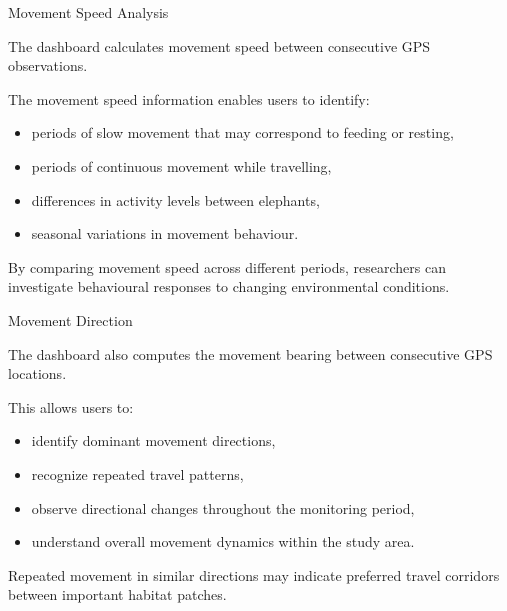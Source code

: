 \documentclass{beamer}
\begin{document}
	
	
	
	
	
		\begin{frame}{Movement Speed Analysis}
		
		The dashboard calculates movement speed between consecutive GPS observations.
		
		The movement speed information enables users to identify:
		
		\begin{itemize}
			\item periods of slow movement that may correspond to feeding or resting,
			\item periods of continuous movement while travelling,
			\item differences in activity levels between elephants,
			\item seasonal variations in movement behaviour.
		\end{itemize}
		
		By comparing movement speed across different periods, researchers can investigate behavioural responses to changing environmental conditions.
	\end{frame}	
	
	
	
	
	
	
		\begin{frame}{Movement Direction}
		
		The dashboard also computes the movement bearing between consecutive GPS locations.
		
		This allows users to:
		
		\begin{itemize}
			\item identify dominant movement directions,
			\item recognize repeated travel patterns,
			\item observe directional changes throughout the monitoring period,
			\item understand overall movement dynamics within the study area.
		\end{itemize}
		
		Repeated movement in similar directions may indicate preferred travel corridors between important habitat patches.
	\end{frame}	
	
	
	
	
	
\end{document}
